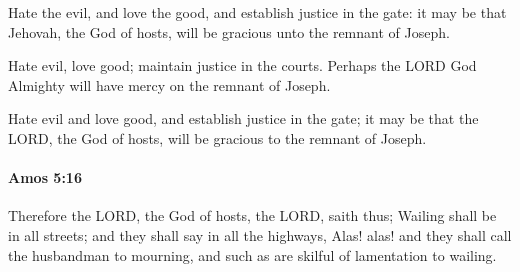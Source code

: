 			\begin{versebox}
					\item[BHS] 
					\item[LXX] 
					\item[ASV] Hate the evil, and love the good, and establish justice in the gate: it may be that Jehovah, the God of hosts, will be gracious unto the remnant of Joseph.
					\item[NIV] Hate evil, love good; maintain justice in the courts. Perhaps the LORD God Almighty will have mercy on the remnant of Joseph.
					\item[NRSV] Hate evil and love good, and establish justice in the gate; it may be that the LORD, the God of hosts, will be gracious to the remnant of Joseph.
			\end{versebox}

		\paragraph{Amos 5:16} %
			\label{AMOS-5-16}

			Therefore the LORD, the God of hosts, the LORD, saith thus; Wailing shall be in all streets; and they shall say in all the highways, Alas! alas! and they shall call the husbandman to mourning, and such as are skilful of lamentation to wailing.

